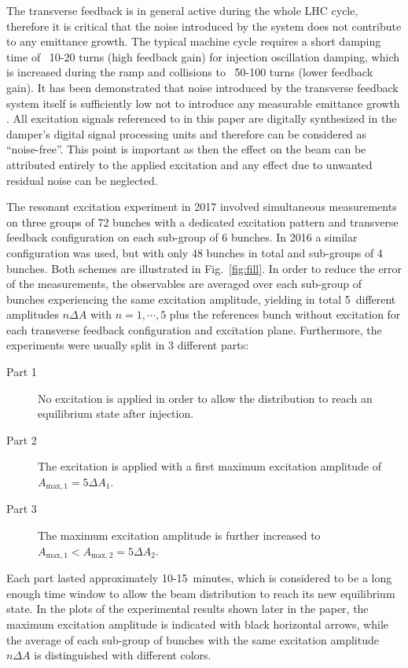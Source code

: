 \documentclass[%
 reprint,
 amsmath,amssymb,
 aps,
prstab,
longbibliography,
]{revtex4-1}
\begin{document}
The transverse feedback is in general active during the whole LHC cycle, therefore it is critical that the noise introduced by the system does not contribute to any emittance growth. The typical machine cycle requires a short damping time of ~10-20 turns (high feedback gain) for injection oscillation damping, which is increased during the ramp and collisions to ~50-100 turns (lower feedback gain). It has been demonstrated that noise introduced by the transverse feedback system itself is sufficiently low not to introduce any measurable emittance growth \cite{adt_noise_emit_2017}. All excitation signals referenced to in this paper are digitally synthesized in the damper's digital signal processing units and therefore can be considered as ``noise-free''. This point is important as then the effect on the beam can be attributed entirely to the applied excitation and any effect due to unwanted residual noise can be neglected.

The resonant excitation experiment in 2017 involved simultaneous measurements on three groups of 72 bunches with a dedicated excitation pattern and transverse feedback configuration on each sub-group of 6 bunches. In 2016 a similar configuration was used, but with only 48 bunches in total and sub-groups of 4 bunches. Both schemes are illustrated in Fig.~\ref{fig:fill}. In order to reduce the error of the measurements, the observables are averaged over each sub-group of bunches experiencing the same excitation amplitude, yielding in total 5~different amplitudes $n\Delta A$ with $n=1,\cdots, 5$ plus the references bunch without excitation for each transverse feedback configuration and excitation plane. Furthermore, the experiments were usually split in 3 different parts:
\begin{description}
	\item[Part 1] No excitation is applied in order to allow the distribution to reach an equilibrium state after injection.
	\item[Part 2] The excitation is applied with a first maximum excitation amplitude of $A_{\mathrm{max,1}}=5\Delta A_1$.
	\item[Part 3] The maximum excitation amplitude is further increased to $A_{\mathrm{max,1}} < A_{\mathrm{max,2}}=5\Delta A_2$.
\end{description}
Each part lasted approximately 10-15~minutes, which is considered to be a long enough time window to allow the beam distribution to reach its new equilibrium state. In the plots of the experimental results shown later in the paper, the maximum excitation amplitude is indicated with black horizontal arrows, while the average of each sub-group of bunches with the same excitation amplitude $n\Delta A$ is distinguished with different colors.
\end{document}
